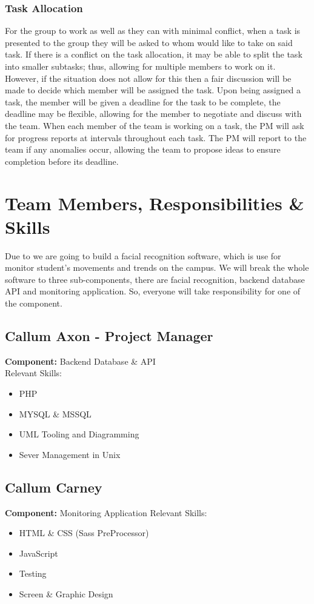 \documentclass[11pt]{report}
\begin{document}
\subsubsection{Task Allocation}
For the group to work as well as they can with minimal conflict, when a task is presented to the group they will be asked to whom would like to take on said task. If there is a conflict on the task allocation, it may be able to split the task into smaller subtasks; thus, allowing for multiple members to work on it. However, if the situation does not allow for this then a fair discussion will be made to decide which member will be assigned the task. Upon being assigned a task, the member will be given a deadline for the task to be complete, the deadline may be flexible, allowing for the member to negotiate and discuss with the team.
When each member of the team is working on a task, the PM will ask for progress reports at intervals throughout each task. The PM will report to the team if any anomalies occur, allowing the team to propose ideas to ensure completion before its deadline.


\section{Team Members, Responsibilities \& Skills}
Due to we are going to build a facial recognition software, which is use for monitor student’s movements and trends on the campus. We will break the whole software to three sub-components, there are facial recognition, backend database API and monitoring application. So, everyone will take responsibility for one of the component. 

\subsection{Callum Axon -  Project Manager}
\textbf{Component:} Backend Database \& API \\
Relevant Skills:
\begin{itemize}
	\item PHP
	\item MYSQL \& MSSQL
	\item UML Tooling and Diagramming
	\item Sever Management in Unix
\end{itemize}

\subsection{Callum Carney}
\textbf{Component:} Monitoring Application 
Relevant Skills:
\begin{itemize}
	\item HTML \& CSS (Sass PreProcessor)
	\item JavaScript
	\item Testing
	\item Screen \& Graphic Design 
\end{itemize}
\end{document}
